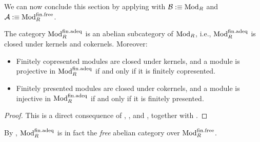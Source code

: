 We can now conclude this section by applying  with $\mathcal{B} :\equiv \textup{Mod}_{R}$ and $\mathcal{A} :\equiv \textup{Mod}_{R}^{\mathrm{fin.free}}$.

\begin{theorem}\label{thm:fin-adeq-abelian}
  The category $\textup{Mod}_{R}^{\mathrm{fin.adeq}}$ is an abelian subcategory of $\textup{Mod}_{R}$, i.e., $\textup{Mod}_{R}^{\mathrm{fin.adeq}}$ is closed under kernels and cokernels. Moreover:
  \begin{itemize}[noitemsep]
  \item Finitely copresented modules are closed under kernels, and a module is projective in $\textup{Mod}_{R}^{\mathrm{fin.adeq}}$ if and only if it is finitely copresented.
  \item Finitely presented modules are closed under cokernels, and a module is injective in $\textup{Mod}_{R}^{\mathrm{fin.adeq}}$ if and only if it is finitely presented.
  \end{itemize}
\end{theorem}

\begin{proof}
  This is a direct consequence of , , and , together with .
\end{proof}

\begin{remark}\label{rem:free-abelian}
  By \cite[Theorem 1.15]{adelman-construction}, $\textup{Mod}_{R}^{\mathrm{fin.adeq}}$ is in fact the \emph{free} abelian category over $\textup{Mod}_{R}^{\mathrm{fin.free}}$.
\end{remark}

